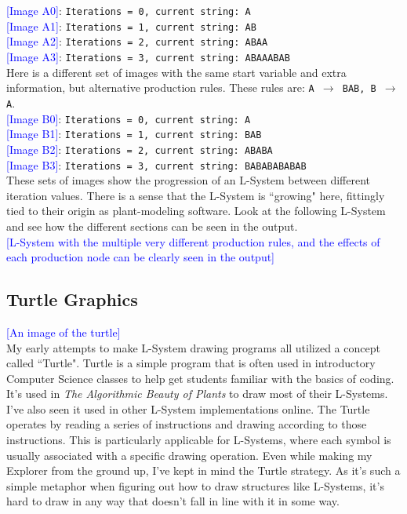 \documentclass[12pt,twoside]{reedthesis}
\newcommand{\code}[1]{\texttt{#1}}
\begin{document}
\textcolor{blue}{[Image A0]}: \code{Iterations = 0, current string: A}\\
\textcolor{blue}{[Image A1]}: \code{Iterations = 1, current string: AB}\\
\textcolor{blue}{[Image A2]}: \code{Iterations = 2, current string: ABAA}\\
\textcolor{blue}{[Image A3]}: \code{Iterations = 3, current string: ABAAABAB} \\

Here is a different set of images with the same start variable and extra information, but alternative production rules. These rules are: \code{A $\rightarrow$ BAB, B $\rightarrow$ A}.\\

\textcolor{blue}{[Image B0]}: \code{Iterations = 0, current string: A}\\
\textcolor{blue}{[Image B1]}: \code{Iterations = 1, current string: BAB}\\
\textcolor{blue}{[Image B2]}: \code{Iterations = 2, current string: ABABA}\\
\textcolor{blue}{[Image B3]}: \code{Iterations = 3, current string: BABABABABAB} \\

These sets of images show the progression of an L-System between different iteration values. There is a sense that the L-System is ``growing" here, fittingly tied to their origin as plant-modeling software. Look at the following L-System and see how the different sections can be seen in the output.\\

	\textcolor{blue}{[L-System with the multiple very different production rules, and the effects of each production node can be clearly seen in the output]}

\subsection{Turtle Graphics}
\label{Turtle-Graphics}

	\textcolor{blue}{[An image of the turtle]}\\

	My early attempts to make L-System drawing programs all utilized a concept called ``Turtle". Turtle is a simple program that is often used in introductory Computer Science classes to help get students familiar with the basics of coding. It's used in \textit{The Algorithmic Beauty of Plants} to draw most of their L-Systems. I've also seen it used in other L-System implementations online. The Turtle operates by reading a series of instructions and drawing according to those instructions. This is particularly applicable for L-Systems, where each symbol is usually associated with a specific drawing operation. Even while making my Explorer from the ground up, I've kept in mind the Turtle strategy. As it's such a simple metaphor when figuring out how to draw structures like L-Systems, it's hard to draw in any way that doesn't fall in line with it in some way.\\
	
\end{document}
